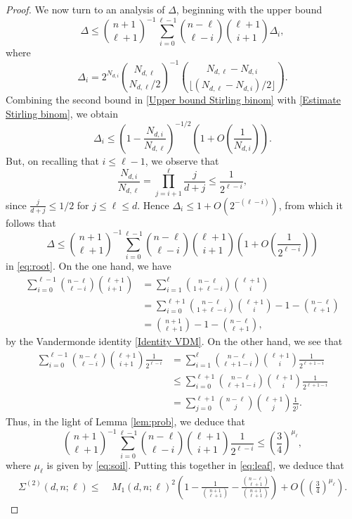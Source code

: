 \documentclass[10pt,a4paper]{amsart}
\renewcommand{\leq}{\leqslant}
\begin{document}
\begin{proof}
We now turn to an analysis of $\Delta$, beginning with the upper bound
\begin{equation}\label{eq:root}
\Delta\leq 
\binom{n+1}{\ell+1}^{-1}
 \sum_{i=0}^{\ell-1} 
 \binom{n-\ell}{\ell-i} \binom{\ell+1}{i+1} \Delta_i,
\end{equation}
where
$$
\Delta_i= 2^{N_{d,i}} 
\binom{N_{d,\ell}}{
N_{d,\ell}/2}^{-1}
 \binom{N_{d,\ell}-N_{d,i}}{
\lfloor (N_{d,\ell}-N_{d,i})/2\rfloor
}.
$$
Combining the second bound in \eqref{Upper bound Stirling binom} with 
\eqref{Estimate Stirling binom}, we obtain  
$$
\Delta_i\leq \left(1-\frac{N_{d,i}}{N_{d,\ell}}\right)^{-1/2}\left(1+O\left(\frac{1}{N_{d,i}}\right)\right).
$$
But, on recalling that $i\leq \ell-1$,  we observe that 
$$
\frac{N_{d,i}}{N_{d,\ell}}=\prod_{j=i+1}^\ell \frac{j}{d+j}\leq \frac{1}{2^{\ell-i}},
$$
since $\frac{j}{d+j}\leq 1/2$ for $j\leq \ell\leq d$. Hence
$
\Delta_i\leq 1+O( 2^{-(\ell-i)})$, 
from which it follows that 
$$
\Delta\leq 
\binom{n+1}{\ell+1}^{-1}
 \sum_{i=0}^{\ell-1} 
 \binom{n-\ell}{\ell-i} \binom{\ell+1}{i+1} \left(1+O\left( \frac{1}{2^{\ell-i}}\right)\right)
$$
in \eqref{eq:root}.
On the one hand, we have 
\begin{align*}
 \sum_{i=0}^{\ell-1} \binom{n-\ell}{\ell-i} \binom{\ell+1}{i+1}
 &= 
 \sum_{i=1}^{\ell} \binom{n-\ell}{1+\ell-i} \binom{\ell+1}{i}\\
 &=
 \sum_{i=0}^{\ell+1} \binom{n-\ell}{1+\ell-i} \binom{\ell+1}{i}-1-\binom{n-\ell}{\ell+1}\\
&= \binom{n+1}{\ell+1}-1-\binom{n-\ell}{\ell+1},
\end{align*}
by the  Vandermonde identity \eqref{Identity VDM}.
On the other hand, we see that 
\begin{align*}
\sum_{i=0}^{\ell-1} 
 \binom{n-\ell}{\ell-i} \binom{\ell+1}{i+1} \frac{1}{2^{\ell-i}}
&=
\sum_{i=1}^{\ell} 
 \binom{n-\ell}{\ell+1-i} \binom{\ell+1}{i} \frac{1}{2^{\ell+1-i}}\\
 &\leq 
\sum_{i=0}^{\ell+1} 
 \binom{n-\ell}{\ell+1-i} \binom{\ell+1}{i} \frac{1}{2^{\ell+1-i}}\\
 &=
\sum_{j=0}^{\ell+1} 
 \binom{n-\ell}{j} \binom{\ell+1}{j} \frac{1}{2^{j}}.
\end{align*}
Thus, in the light of Lemma \ref{lem:prob}, we deduce that 
$$
\binom{n+1}{\ell+1}^{-1}
\sum_{i=0}^{\ell-1} 
 \binom{n-\ell}{\ell-i} \binom{\ell+1}{i+1} \frac{1}{2^{\ell-i}}
\leq 
\left(\frac{3}{4}\right)^{\mu_\ell},
$$
where $\mu_\ell$ is given by \eqref{eq:soil}.
Putting this together in \eqref{eq:leaf}, we deduce that 
\begin{equation}\label{eq:stalk}
\begin{split}
\Sigma^{(2)}(d,n;\ell)
\leq~& M_1(d,n;\ell)^2\left(1
-\frac{1}{\binom{n+1}{\ell+1}}
-\frac{\binom{n-\ell}{\ell+1}}{\binom{n+1}{\ell+1}}\right) +O\left( 
\left(\frac{3}{4}\right)^{\mu_\ell}
\right).
\end{split}
\end{equation}



\end{proof}
\end{document}
